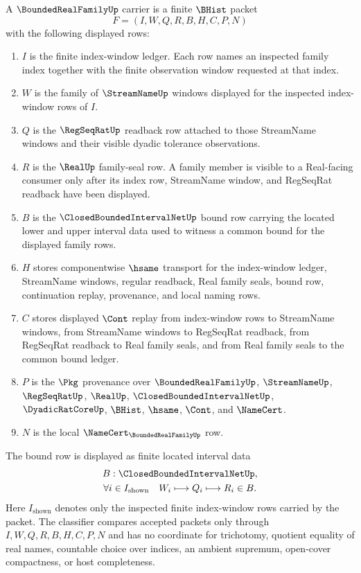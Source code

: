\begin{definition}
\label{def:bounded-real-family-carrier}
A $\BoundedRealFamilyUp$ carrier is a finite $\BHist$ packet
$$
F=(I,W,Q,R,B,H,C,P,N)
$$
with the following displayed rows:
\begin{enumerate}
\item $I$ is the finite index-window ledger. Each row names an inspected family index together with the finite observation window requested at that index.
\item $W$ is the family of $\StreamNameUp$ windows displayed for the inspected index-window rows of $I$.
\item $Q$ is the $\RegSeqRatUp$ readback row attached to those StreamName windows and their visible dyadic tolerance observations.
\item $R$ is the $\RealUp$ family-seal row. A family member is visible to a Real-facing consumer only after its index row, StreamName window, and RegSeqRat readback have been displayed.
\item $B$ is the $\ClosedBoundedIntervalNetUp$ bound row carrying the located lower and upper interval data used to witness a common bound for the displayed family rows.
\item $H$ stores componentwise $\hsame$ transport for the index-window ledger, StreamName windows, regular readback, Real family seals, bound row, continuation replay, provenance, and local naming rows.
\item $C$ stores displayed $\Cont$ replay from index-window rows to StreamName windows, from StreamName windows to RegSeqRat readback, from RegSeqRat readback to Real family seals, and from Real family seals to the common bound ledger.
\item $P$ is the $\Pkg$ provenance over $\BoundedRealFamilyUp$, $\StreamNameUp$, $\RegSeqRatUp$, $\RealUp$, $\ClosedBoundedIntervalNetUp$, $\DyadicRatCoreUp$, $\BHist$, $\hsame$, $\Cont$, and $\NameCert$.
\item $N$ is the local $\NameCert_{\BoundedRealFamilyUp}$ row.
\end{enumerate}
The bound row is displayed as finite located interval data
$$
\begin{gathered}
B:\ClosedBoundedIntervalNetUp,\\
\forall i\in I_{\mathrm{shown}}\quad W_i\longmapsto Q_i\longmapsto R_i\in B.
\end{gathered}
$$
Here $I_{\mathrm{shown}}$ denotes only the inspected finite index-window rows carried by the packet. The classifier compares accepted packets only through $I,W,Q,R,B,H,C,P,N$ and has no coordinate for trichotomy, quotient equality of real names, countable choice over indices, an ambient supremum, open-cover compactness, or host completeness.
\end{definition}

